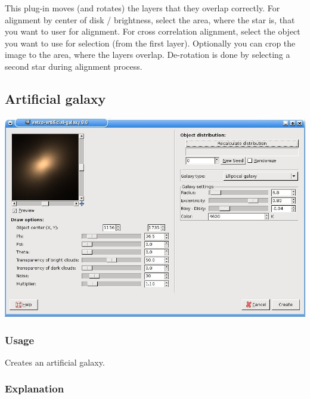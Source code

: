 \documentclass[a4paper]{article}
\begin{document}
% 

This plug-in moves (and rotates) the layers that they overlap correctly. For alignment by center of disk / brightness, select the area, where the star is, that you want to user for alignment. For cross correlation alignment, select the object you want to use for selection (from the first layer). Optionally you can crop the image to the area, where the layers overlap. De-rotation is done by selecting a second star during alignment process.

\subsection{Artificial galaxy}

\begin{center}\includegraphics[width=1.0\textwidth]{artificial_galaxy.jpg}\end{center}

\subsubsection{Usage}

Creates an artificial galaxy.

\subsubsection{Explanation}
\end{document}

